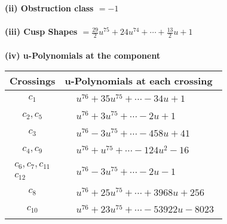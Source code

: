 \documentclass[1p]{elsarticle_modified}
\theoremstyle{definition}
\begin{document}
\flushleft \textbf{(ii) Obstruction class $= -1$}\\~\\
\flushleft \textbf{(iii) Cusp Shapes $= \frac{29}{2} u^{75}+24 u^{74}+\cdots+\frac{13}{2} u+1$}\\~\\
\newpage\renewcommand{\arraystretch}{1}
\flushleft \textbf{(iv) u-Polynomials at the component}\newline \\
\begin{tabular}{m{50pt}|m{274pt}}
Crossings & \hspace{64pt}u-Polynomials at each crossing \\
\hline $$\begin{aligned}c_{1}\end{aligned}$$&$\begin{aligned}
&u^{76}+35 u^{75}+\cdots-34 u+1
\end{aligned}$\\
\hline $$\begin{aligned}c_{2},c_{5}\end{aligned}$$&$\begin{aligned}
&u^{76}+3 u^{75}+\cdots-2 u+1
\end{aligned}$\\
\hline $$\begin{aligned}c_{3}\end{aligned}$$&$\begin{aligned}
&u^{76}-3 u^{75}+\cdots-458 u+41
\end{aligned}$\\
\hline $$\begin{aligned}c_{4},c_{9}\end{aligned}$$&$\begin{aligned}
&u^{76}+u^{75}+\cdots-124 u^2-16
\end{aligned}$\\
\hline $$\begin{aligned}c_{6},c_{7},c_{11}\\c_{12}\end{aligned}$$&$\begin{aligned}
&u^{76}-3 u^{75}+\cdots-2 u-1
\end{aligned}$\\
\hline $$\begin{aligned}c_{8}\end{aligned}$$&$\begin{aligned}
&u^{76}+25 u^{75}+\cdots+3968 u+256
\end{aligned}$\\
\hline $$\begin{aligned}c_{10}\end{aligned}$$&$\begin{aligned}
&u^{76}+23 u^{75}+\cdots-53922 u-8023
\end{aligned}$\\
\hline
\end{tabular}\\~\\
\end{document}
